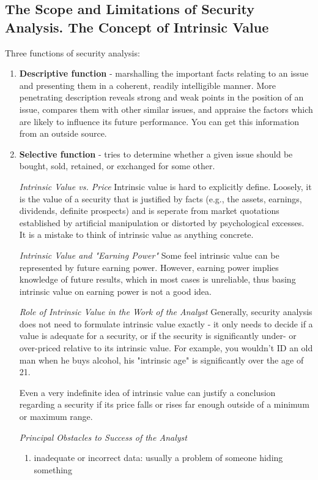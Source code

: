 \documentclass{article}
\begin{document}
\subsection{The Scope and Limitations of Security Analysis. The Concept of Intrinsic Value}
Three functions of security analysis:
\begin{enumerate}
\item \textbf{Descriptive function} - marshalling the important facts relating to an issue and presenting them in a coherent, readily intelligible manner. More penetrating description reveals strong and weak points in the position of an issue, compares them with other similar issues, and appraise the factors which are likely to influence its future performance. You can get this information from an outside source.
\item \textbf{Selective function} - tries to determine whether a given issue should be bought, sold, retained, or exchanged for some other.
\par
\textit{Intrinsic Value vs. Price} Intrinsic value is hard to explicitly define. Loosely, it is the value of a security that is justified by facts (e.g., the assets, earnings, dividends, definite prospects) and is seperate from market quotations established by artificial manipulation or distorted by psychological excesses. It is a mistake to think of intrinsic value as anything concrete.
\par
\textit{Intrinsic Value and "Earning Power"} Some feel intrinsic value can be represented by future earning power. However, earning power implies knowledge of future results, which in most cases is unreliable, thus basing intrinsic value on earning power is not a good idea. 
\par
\textit{Role of Intrinsic Value in the Work of the Analyst} Generally, security analysis does not need to formulate intrinsic value exactly - it only needs to decide if a value is adequate for a security, or if the security is significantly under- or over-priced relative to its intrinsic value. For example, you wouldn't ID an old man when he buys alcohol, his "intrinsic age" is significantly over the age of 21.
\par
Even a very indefinite idea of intrinsic value can justify a conclusion regarding a security if its price falls or rises far enough outside of a minimum or maximum range.
\par
\textit{Principal Obstacles to Success of the Analyst}
\begin{enumerate}
\item inadequate or incorrect data: usually a problem of someone hiding something

\end{enumerate}
\end{enumerate}
\end{document}
